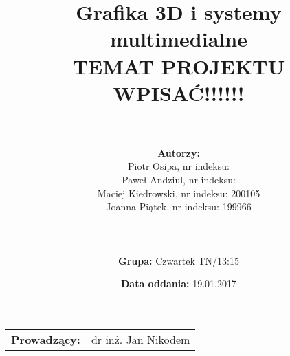 \documentclass{article}
\title{Grafika 3D i systemy multimedialne\\
	\vspace{5mm}
	\textbf{TEMAT PROJEKTU WPISAĆ!!!!!!}}
\author{\\
	\\\textbf{Autorzy:}
	\\Piotr Osipa, nr indeksu:
	\\Paweł Andziul, nr indeksu: 
	\\Maciej Kiedrowski, nr indeksu: 200105
	\\Joanna Piątek, nr indeksu: 199966
	\\\\
	\\
	\\\textbf{Grupa:} Czwartek TN/13:15}
\date{\textbf{Data oddania:} 19.01.2017}
\begin{document}
\maketitle %

\begin{center}
\begin{tabular}{l r}
\textbf{Prowadzący:} & dr inż. Jan Nikodem %
\end{tabular}
\end{center}
 
\newpage
\tableofcontents 	%
\newpage





\end{document}
